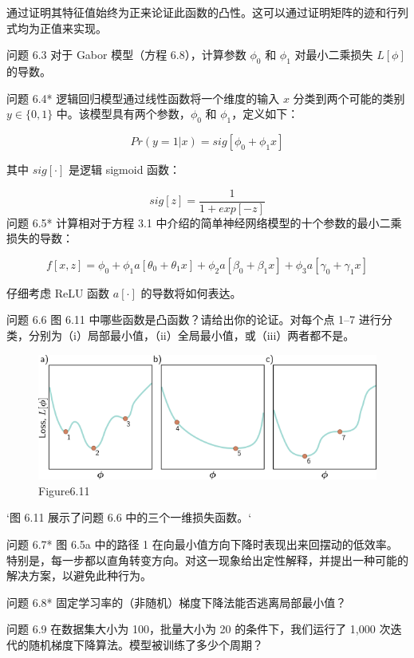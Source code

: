 通过证明其特征值始终为正来论证此函数的凸性。这可以通过证明矩阵的迹和行列式均为正值来实现。

问题 6.3 对于 Gabor 模型（方程 6.8），计算参数 \(\phi_0\) 和 \(\phi_1\) 对最小二乘损失 \(L[\phi]\) 的导数。

问题 6.4* 逻辑回归模型通过线性函数将一个维度的输入 \(x\) 分类到两个可能的类别 \(y \in \{0,1\}\) 中。该模型具有两个参数，\(\phi_0\) 和 \(\phi_1\)，定义如下：

\begin{equation}
Pr(y = 1|x) = sig[\phi_0 + \phi_1x] 
\end{equation}

其中 \(sig[\cdot]\) 是逻辑 sigmoid 函数：

\begin{equation}
sig[z] = \frac{1}{1 + exp[-z]} 
\end{equation}
问题 6.5* 计算相对于方程 3.1 中介绍的简单神经网络模型的十个参数的最小二乘损失的导数：

\begin{equation}
f[x,z] = \phi_0 + \phi_1a[\theta_0 + \theta_1x] + \phi_2a[\beta_0 + \beta_1x] + \phi_3a[\gamma_0 + \gamma_1x] 
\end{equation}

仔细考虑 ReLU 函数 \(a[\cdot]\) 的导数将如何表达。

问题 6.6 图 6.11 中哪些函数是凸函数？请给出你的论证。对每个点 1–7 进行分类，分别为（i）局部最小值，（ii）全局最小值，或（iii）两者都不是。

\begin{figure}[ht!]
\centering
\includegraphics[width=0.7\linewidth]{png/chapter6/TrainConvexProb.png}
\caption{Figure6.11}
\end{figure}

`图 6.11 展示了问题 6.6 中的三个一维损失函数。`

问题 6.7* 图 6.5a 中的路径 1 在向最小值方向下降时表现出来回摆动的低效率。特别是，每一步都以直角转变方向。对这一现象给出定性解释，并提出一种可能的解决方案，以避免此种行为。

问题 6.8* 固定学习率的（非随机）梯度下降法能否逃离局部最小值？

问题 6.9 在数据集大小为 100，批量大小为 20 的条件下，我们运行了 1,000 次迭代的随机梯度下降算法。模型被训练了多少个周期？


